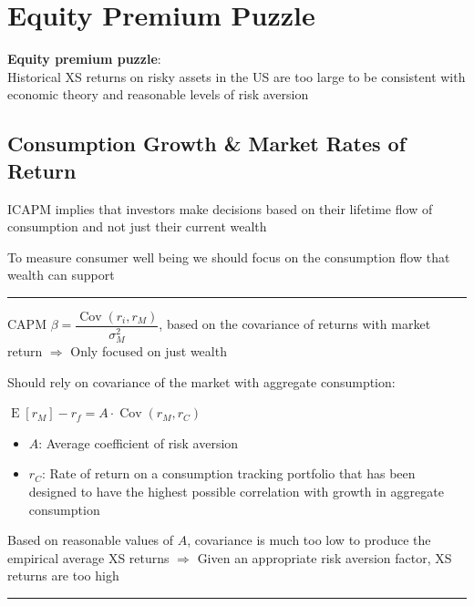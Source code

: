 \documentclass[]{book}
\theoremstyle{definition}
\theoremstyle{definition}
\theoremstyle{remark}
\begin{document}
\section{Equity Premium Puzzle}\label{equity-premium-puzzle}

\textbf{Equity premium puzzle}:\\
Historical XS returns on risky assets in the US are too large to be
consistent with economic theory and reasonable levels of risk aversion

\subsection{Consumption Growth \& Market Rates of
Return}\label{consumption-growth-market-rates-of-return}

ICAPM implies that investors make decisions based on their lifetime flow
of consumption and not just their current wealth

To measure consumer well being we should focus on the consumption flow
that wealth can support

\begin{center}\rule{0.5\linewidth}{\linethickness}\end{center}

CAPM \(\beta = \dfrac{\operatorname{Cov}(r_i, r_M)}{\sigma^2_M}\), based
on the covariance of returns with market return \(\Rightarrow\) Only
focused on just wealth

Should rely on covariance of the market with aggregate consumption:

\(\operatorname{E}[r_M] - r_f = A \cdot \operatorname{Cov}(r_M, r_C)\)

\begin{itemize}
\item
  \(A\): Average coefficient of risk aversion
\item
  \(r_C\): Rate of return on a consumption tracking portfolio that has
  been designed to have the highest possible correlation with growth in
  aggregate consumption
\end{itemize}

Based on reasonable values of \(A\), covariance is much too low to
produce the empirical average XS returns \(\Rightarrow\) Given an
appropriate risk aversion factor, XS returns are too high

\begin{center}\rule{0.5\linewidth}{\linethickness}\end{center}
\end{document}
